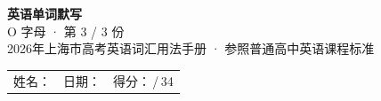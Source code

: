 \documentclass[10pt,a4paper]{article}
\begin{document}
\pagestyle{plain}

\begin{center}
{\LARGE\bfseries 英语单词默写}\\[0.22em]
{\large O 字母 · 第 3 / 3 份}\\[0.18em]
{\small 2026年上海市高考英语词汇用法手册 · 参照普通高中英语课程标准}
\end{center}

\vspace{0.25em}
\noindent\begin{tabular}{@{}p{}@{}p{}@{}p{}@{}}
姓名：\underline{\hspace{2.0cm}} & 日期：\underline{\hspace{2.0cm}} & 得分：\underline{\hspace{1.3cm}}\,/\,34 \\
\end{tabular}

\vspace{0.3em}

\vspace{0.08em}
\end{document}
